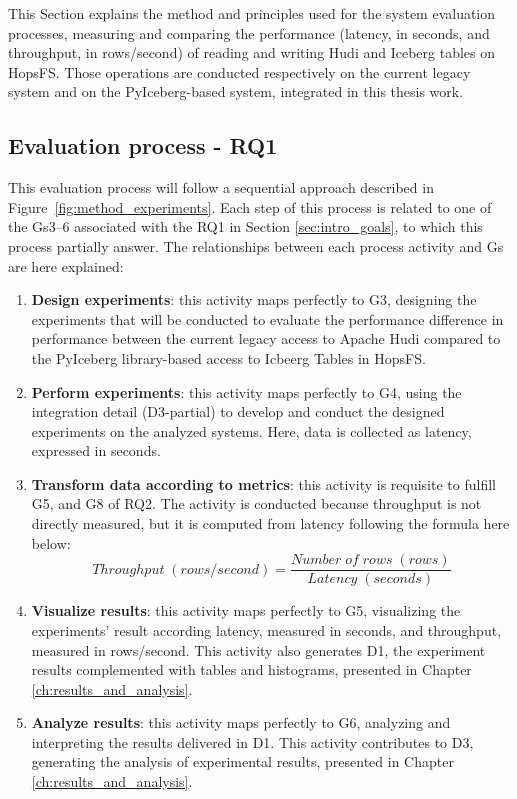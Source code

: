 This Section explains the method and principles used for the system evaluation processes, measuring and comparing the performance (latency, in seconds, and throughput, in rows/second) of reading and writing Hudi and Iceberg tables on \gls{HopsFS}. Those operations are conducted respectively on the current legacy system and on the PyIceberg-based system, integrated in this thesis work.

\subsection{Evaluation process - RQ1}
\label{subsec:eval_process_hudi_iceberg}
This evaluation process will follow a sequential approach described in Figure~\ref{fig:method_experiments}. Each step of this process is related to one of the \glspl{G}3--6 associated with the \gls{RQ}1 in Section \ref{sec:intro_goals}, to which this process partially answer. The relationships between each process activity and \glspl{G} are here explained:
\begin{enumerate}
    \item \textbf{Design experiments}: this activity maps perfectly to \gls{G}3, designing the experiments that will be conducted to evaluate the performance difference in performance between the current legacy access to Apache Hudi compared to the PyIceberg library-based access to Icbeerg Tables in \gls{HopsFS}. 
    \item \textbf{Perform experiments}: this activity maps perfectly to \gls{G}4, using the integration detail (\gls{D}3-partial) to develop and conduct the designed experiments on the analyzed systems. Here, data is collected as latency, expressed in seconds.
    \item \textbf{Transform data according to metrics}: this activity is requisite to fulfill \gls{G}5, and \gls{G}8 of \gls{RQ}2. The activity is conducted because throughput is not directly measured, but it is computed from latency following the formula here below:
    \[ Throughput \; (rows/second) = \frac{Number \; of \; rows \; (rows)}{Latency \;(seconds)}\]
    \item \textbf{Visualize results}: this activity maps perfectly to \gls{G}5, visualizing the experiments' result according latency, measured in seconds, and throughput, measured in rows/second. This activity also generates \gls{D}1, the experiment results complemented with tables and histograms, presented in Chapter \ref{ch:results_and_analysis}.
    \item \textbf{Analyze results}: this activity maps perfectly to \gls{G}6, analyzing and interpreting the results delivered in \gls{D}1. This activity contributes to \gls{D}3, generating the analysis of experimental results, presented in Chapter \ref{ch:results_and_analysis}.
\end{enumerate}
